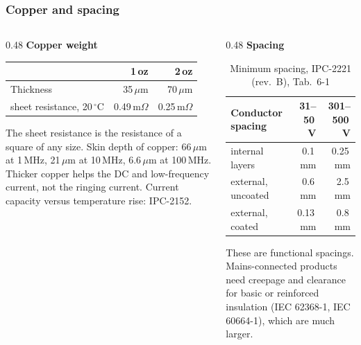 \begin{frame}
	\frametitle{Copper and spacing}
	\begin{columns}[T]
		\begin{column}{0.48\textwidth}
			\textbf{Copper weight}
			\begin{table}
				\centering
				\footnotesize
				\begin{tabular}{|l|r|r|}
					\hline
					                      & 1\,oz    & 2\,oz    \\
					\hline
					Thickness             & 35\,$\mu$m & 70\,$\mu$m \\
					sheet resistance, 20\,$^\circ$C & 0.49\,m$\Omega$ & 0.25\,m$\Omega$ \\
					\hline
				\end{tabular}
			\end{table}
			The sheet resistance is the resistance of a square of any size. Skin depth of copper: 66\,$\mu$m at 1\,MHz, 21\,$\mu$m at 10\,MHz, 6.6\,$\mu$m at 100\,MHz. Thicker copper helps the DC and low-frequency current, not the ringing current. Current capacity versus temperature rise: IPC-2152.
		\end{column}
		\begin{column}{0.48\textwidth}
			\textbf{Spacing}
			\begin{table}
				\centering
				\footnotesize
				\begin{tabular}{|l|r|r|}
					\hline
					Conductor spacing        & 31--50\,V & 301--500\,V \\
					\hline
					internal layers          & 0.1\,mm   & 0.25\,mm \\
					external, uncoated       & 0.6\,mm   & 2.5\,mm  \\
					external, coated         & 0.13\,mm  & 0.8\,mm  \\
					\hline
				\end{tabular}
				\caption{Minimum spacing, IPC-2221 (rev.\ B), Tab.\ 6-1}
			\end{table}
			These are functional spacings. Mains-connected products need creepage and clearance for basic or reinforced insulation (IEC 62368-1, IEC 60664-1), which are much larger.
		\end{column}
	\end{columns}
\end{frame}

